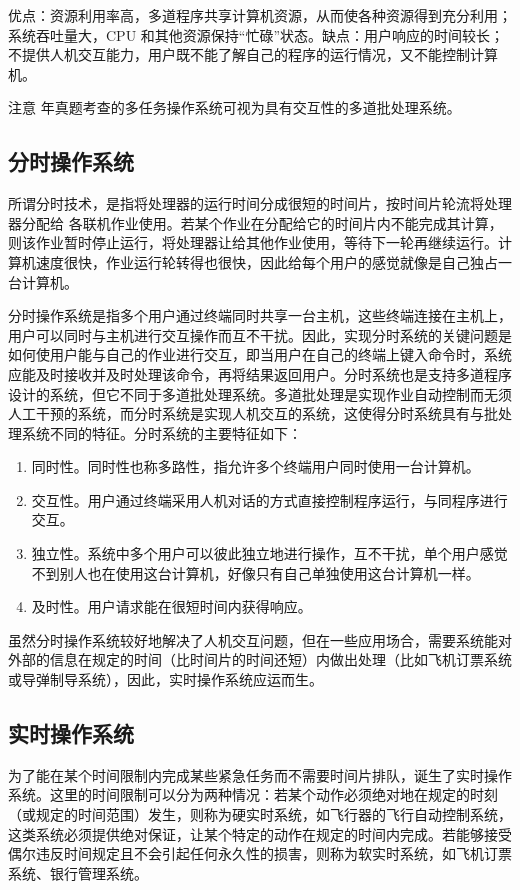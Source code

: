 \documentclass{ctexbook}
\begin{document}
	优点：资源利用率高，多道程序共享计算机资源，从而使各种资源得到充分利用；系统吞吐量大，CPU 和其他资源保持“忙碌”状态。缺点：用户响应的时间较长；不提供人机交互能力，用户既不能了解自己的程序的运行情况，又不能控制计算机。
	
	\colorbox{gray!20}{注意  年真题考查的多任务操作系统可视为具有交互性的多道批处理系统。}
	
	\subsection{分时操作系统}
	所谓分时技术，是指将处理器的运行时间分成很短的时间片，按时间片轮流将处理器分配给
	各联机作业使用。若某个作业在分配给它的时间片内不能完成其计算，则该作业暂时停止运行，将处理器让给其他作业使用，等待下一轮再继续运行。计算机速度很快，作业运行轮转得也很快，因此给每个用户的感觉就像是自己独占一台计算机。
	
	分时操作系统是指多个用户通过终端同时共享一台主机，这些终端连接在主机上，用户可以同时与主机进行交互操作而互不干扰。因此，实现分时系统的关键问题是如何使用户能与自己的作业进行交互，即当用户在自己的终端上键入命令时，系统应能及时接收并及时处理该命令，再将结果返回用户。分时系统也是支持多道程序设计的系统，但它不同于多道批处理系统。多道批处理是实现作业自动控制而无须人工干预的系统，而分时系统是实现人机交互的系统，这使得分时系统具有与批处理系统不同的特征。分时系统的主要特征如下：
	\begin{enumerate}
		\item 同时性。同时性也称多路性，指允许多个终端用户同时使用一台计算机。
		\item 交互性。用户通过终端采用人机对话的方式直接控制程序运行，与同程序进行交互。
		\item 独立性。系统中多个用户可以彼此独立地进行操作，互不干扰，单个用户感觉不到别人也在使用这台计算机，好像只有自己单独使用这台计算机一样。
		\item 及时性。用户请求能在很短时间内获得响应。
	\end{enumerate}
	虽然分时操作系统较好地解决了人机交互问题，但在一些应用场合，需要系统能对外部的信息在规定的时间（比时间片的时间还短）内做出处理（比如飞机订票系统或导弹制导系统），因此，实时操作系统应运而生。
	
	\subsection{实时操作系统}
	为了能在某个时间限制内完成某些紧急任务而不需要时间片排队，诞生了实时操作系统。这里的时间限制可以分为两种情况：若某个动作必须绝对地在规定的时刻（或规定的时间范围）发生，则称为硬实时系统，如飞行器的飞行自动控制系统，这类系统必须提供绝对保证，让某个特定的动作在规定的时间内完成。若能够接受偶尔违反时间规定且不会引起任何永久性的损害，则称为软实时系统，如飞机订票系统、银行管理系统。
	
\end{document}
